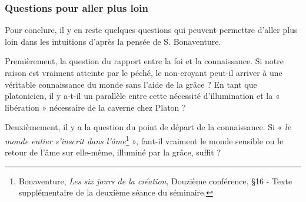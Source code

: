 \subsubsection*{Questions pour aller plus loin}

Pour conclure, il y en reste quelques questions qui peuvent permettre d'aller plus loin dans les intuitions d'après la pensée de S. Bonaventure.

Premièrement, la question du rapport entre la foi et la connaissance. Si notre raison est vraiment atteinte par le péché, le non-croyant peut-il arriver à une véritable connaissance du monde sans l'aide de la grâce ? En tant que platonicien, il y a-t-il un parallèle entre cette nécessité d'illumination et la « libération » nécessaire de la caverne chez Platon ?

Deuxièmement, il y a la question du point de départ de la connaissance. Si « \emph{le monde entier s'inscrit dans l'âme}\footnote{Bonaventure, \emph{Les six jours de la création}, Douzième conférence, §16 - Texte supplémentaire de la deuxième séance du séminaire.} », faut-il vraiment le monde sensible ou le retour de l'âme sur elle-même, illuminé par la grâce, suffit ?